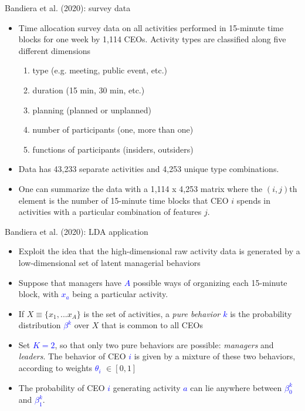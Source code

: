 \documentclass[english]{beamer}
\begin{document}
\begin{frame}{Bandiera et al. (2020): survey data}
\begin{itemize}
\setlength{\itemsep}{1.2em}
\item Time allocation survey data on all activities performed in 15-minute time blocks for one week by 1,114 CEOs. Activity types are classified along five different dimensions 
\begin{enumerate}\vspace{5pt}
\setlength{\itemsep}{0.6em}
    \item type (e.g. meeting, public event, etc.)
    \item duration (15 min, 30 min, etc.)
    \item planning (planned or unplanned)
    \item number of participants (one, more than one)
    \item functions of participants (insiders, outsiders)
\end{enumerate}
\item Data has 43,233 separate activities and 4,253 unique type combinations.  
\item One can summarize the data with a 1,114 x 4,253 matrix where the $(i,j)$th element is the number of 15-minute time blocks that CEO $i$ spends in activities with a particular combination of features $j$.
\end{itemize}
\end{frame}%

\begin{frame}{Bandiera et al. (2020): LDA application}
\begin{itemize}
\setlength{\itemsep}{1.5em}
\item Exploit the idea that the high-dimensional raw activity data is generated by a low-dimensional set of latent managerial behaviors
\item Suppose that managers have \textcolor{blue}{$A$} possible ways of organizing each 15-minute block, with \textcolor{blue}{$x_a$} being a particular activity. 
\item If $X \equiv \{x_1,...x_A\}$ is the set of activities, a \textit{pure behavior \textcolor{blue}{$k$}} is the probability distribution \textcolor{blue}{$\beta^k$} over $X$ that is common to all CEOs
\item Set \textcolor{blue}{$K=2$}, so that only two pure behaviors are possible: \textit{managers} and \textit{leaders}. The behavior of CEO \textcolor{blue}{$i$} is given by a mixture of these two behaviors, according to weights \textcolor{blue}{$\theta_i$} $\in [0,1]$

\item The probability of CEO \textcolor{blue}{$i$} generating activity \textcolor{blue}{$a$} can lie anywhere between \textcolor{blue}{$\beta^k_0$} and \textcolor{blue}{$\beta^k_1$}.

\end{itemize}
\end{frame}%
\end{document}
